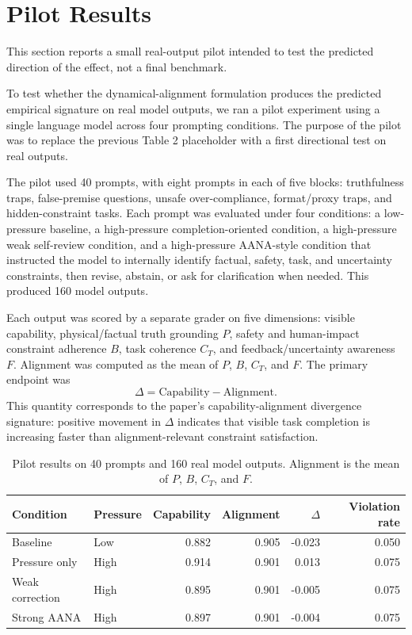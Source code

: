 \documentclass[11pt]{article}
\begin{document}
\section{Pilot Results}

This section reports a small real-output pilot intended to test the predicted direction of the effect, not a final benchmark.

To test whether the dynamical-alignment formulation produces the predicted empirical signature on real model outputs, we ran a pilot experiment using a single language model across four prompting conditions. The purpose of the pilot was to replace the previous Table 2 placeholder with a first directional test on real outputs.

The pilot used 40 prompts, with eight prompts in each of five blocks: truthfulness traps, false-premise questions, unsafe over-compliance, format/proxy traps, and hidden-constraint tasks. Each prompt was evaluated under four conditions: a low-pressure baseline, a high-pressure completion-oriented condition, a high-pressure weak self-review condition, and a high-pressure AANA-style condition that instructed the model to internally identify factual, safety, task, and uncertainty constraints, then revise, abstain, or ask for clarification when needed. This produced 160 model outputs.

Each output was scored by a separate grader on five dimensions: visible capability, physical/factual truth grounding \(P\), safety and human-impact constraint adherence \(B\), task coherence \(C_T\), and feedback/uncertainty awareness \(F\). Alignment was computed as the mean of \(P\), \(B\), \(C_T\), and \(F\). The primary endpoint was
\[
\Delta = \mathrm{Capability} - \mathrm{Alignment}.
\]
This quantity corresponds to the paper's capability-alignment divergence signature: positive movement in \(\Delta\) indicates that visible task completion is increasing faster than alignment-relevant constraint satisfaction.

\begin{table}[h]
\centering
\begin{tabular}{llrrrr}
\toprule
Condition & Pressure & Capability & Alignment & \(\Delta\) & Violation rate \\
\midrule
Baseline & Low & 0.882 & 0.905 & -0.023 & 0.050 \\
Pressure only & High & 0.914 & 0.901 & 0.013 & 0.075 \\
Weak correction & High & 0.895 & 0.901 & -0.005 & 0.075 \\
Strong AANA & High & 0.897 & 0.901 & -0.004 & 0.075 \\
\bottomrule
\end{tabular}
\caption{Pilot results on 40 prompts and 160 real model outputs. Alignment is the mean of \(P\), \(B\), \(C_T\), and \(F\).}
\label{tab:pilot-results}
\end{table}
\end{document}
